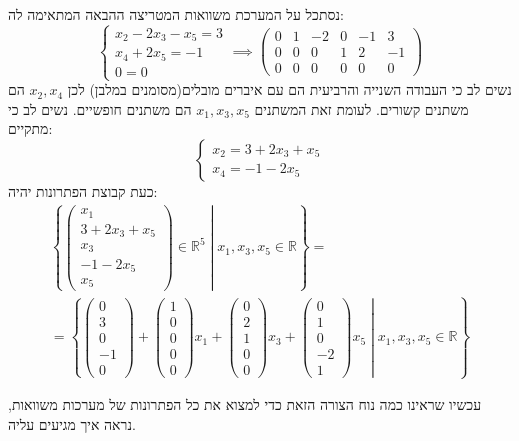 \documentclass{tstextbook}
\begin{document}
\begin{example}
נסתכל על המערכת משוואות המטריצה ההבאה המתאימה לה:
$$\begin{cases}x_{2}-2x_{3}-x_{5}=3 \\x_{4}+2x_{5}=-1 \\0=0\end{cases}\implies\left(\begin{array}{ccccc|c}0&\boxed{1}&-2&0&-1 &3\\0&0&0&\boxed{1}&2 &-1\\0&0&0&0&0&0
\end{array}\right)$$
נשים לב כי העבודה השנייה והרביעית הם עם איברים מובלים(מסומנים במלבן) לכן \(x_{2},x_{4}\) הם משתנים קשורים. לעומת זאת המשתנים \(x_{1},x_3,x_{5}\) הם משתנים חופשיים. נשים לב כי מתקיים:
$$\begin{cases}x_{2}=3+2x_{3}+x_{5} \\x_{4}=-1-2x_{5}
\end{cases}$$
כעת קבוצת הפתרונות יהיה:
$$\begin{gather}\left.\left\{  \begin{pmatrix}x_{1} \\3+2x_{3}+x_{5} \\x_{3} \\-1-2x_{5} \\x_{5}\end{pmatrix} \in \mathbb{R}^{5} \;\right\rvert\;   x_{1},x_{3},x_{5} \in \mathbb{R}   \right\}= \\=\left.\left\{  \begin{pmatrix}0 \\3 \\0 \\-1 \\0\end{pmatrix} +\begin{pmatrix}1\\0\\0\\0\\0\end{pmatrix}x_{1}+\begin{pmatrix}0\\2\\1\\0\\0\end{pmatrix}x_{3}+\begin{pmatrix}0\\1\\0\\-2\\1 \end{pmatrix} x_{5}\;\right\rvert\;x_{1},x_{3},x_{5} \in \mathbb{R}\right\} 
\end{gather}$$

\end{example}
עכשיו שראינו כמה נוח הצורה הזאת כדי למצוא את כל הפתרונות של מערכות משוואות, נראה איך מגיעים עליה.
\end{document}
